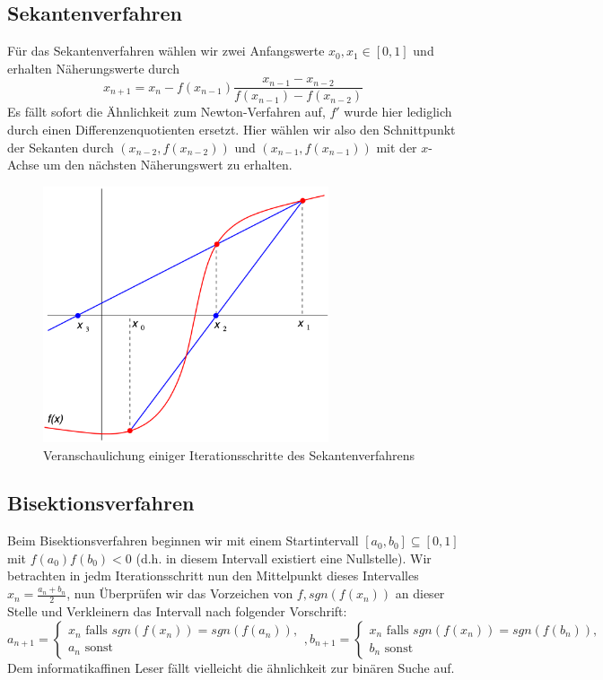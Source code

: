 \documentclass[a4paper,12pt]{article}
\newcommand{\1}{1\hspace{-0,9ex}1}
\begin{document}
\subsection*{Sekantenverfahren}
Für das Sekantenverfahren wählen wir zwei Anfangswerte $x_0,x_1 \in [0,1]$ und erhalten Näherungswerte durch
\[
	x_{n+1}= x_n - f(x_{n-1})\frac{x_{n-1}-x_{n-2}}{f(x_{n-1})-f(x_{n-2})}
\]
Es fällt sofort die Ähnlichkeit zum Newton-Verfahren auf, $f'$ wurde hier lediglich durch einen Differenzenquotienten ersetzt. Hier wählen wir also den Schnittpunkt der Sekanten durch $(x_{n-2}, f(x_{n-2}))$ und $(x_{n-1}, f(x_{n-1}))$ mit der $x$-Achse um den nächsten Näherungswert zu erhalten.

\begin{figure}[H]
	\centering
	\includegraphics[width=0.75\textwidth]{plots/sekant.png}
	\caption{Veranschaulichung einiger Iterationsschritte des Sekantenverfahrens}
\end{figure}

\subsection*{Bisektionsverfahren}
Beim Bisektionsverfahren beginnen wir mit einem Startintervall $[a_0, b_0] \subseteq [0,1]$ mit $f(a_0)f(b_0) < 0$ (d.h. in diesem Intervall existiert eine Nullstelle). Wir betrachten in jedm Iterationsschritt nun den Mittelpunkt dieses Intervalles $x_n = \frac{a_n + b_n}{2}$, nun Überprüfen wir das Vorzeichen von $f, sgn(f(x_n))$ an dieser Stelle und Verkleinern das Intervall nach folgender Vorschrift:
\[
	a_{n+1} = \begin{cases}
		x_n\text{ falls } sgn(f(x_n))=sgn(f(a_n)), \\
		a_n\text{ sonst}
	\end{cases}, b_{n+1} = \begin{cases}
		x_n\text{ falls } sgn(f(x_n))=sgn(f(b_n)), \\
		b_n\text{ sonst}
	\end{cases}
\]
Dem informatikaffinen Leser fällt vielleicht die ähnlichkeit zur binären Suche auf.
\end{document}

